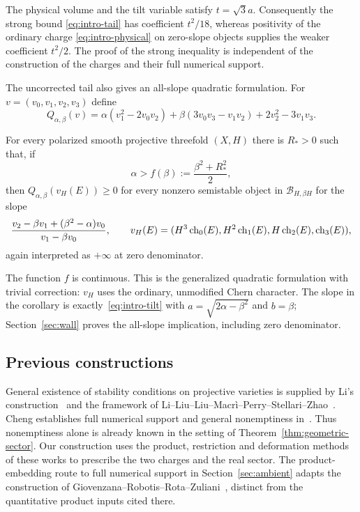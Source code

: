 The physical volume and the tilt variable satisfy $t=\sqrt3a$.
Consequently the strong bound \eqref{eq:intro-tail} has coefficient
$t^2/18$, whereas positivity of the ordinary charge
\eqref{eq:intro-physical} on zero-slope objects supplies the weaker
coefficient $t^2/2$. The proof of the strong inequality is independent of
the construction of the charges and their full numerical support.

The uncorrected tail also gives an all-slope quadratic formulation.
For $v=(v_0,v_1,v_2,v_3)$ define
\begin{equation}\label{eq:intro-quadratic}
 Q_{\alpha,\beta}(v)=
 \alpha(v_1^2-2v_0v_2)
 +\beta(3v_0v_3-v_1v_2)+2v_2^2-3v_1v_3.
\end{equation}
\begin{corollary}
\label{cor:quadratic-tail}
For every polarized smooth projective threefold $(X,H)$ there is $R_*>0$
such that, if
\[
 \alpha>f(\beta):=\frac{\beta^2+R_*^2}{2},
\]
then $Q_{\alpha,\beta}(v_H(E))\geq0$ for every nonzero semistable object
in $\mathcal B_{H,\beta H}$ for the slope
\[
 \frac{v_2-\beta v_1+(\beta^2-\alpha)v_0}{v_1-\beta v_0},
 \qquad
 v_H(E)=(H^3\operatorname{ch}_0(E),H^2\operatorname{ch}_1(E),H\operatorname{ch}_2(E),\operatorname{ch}_3(E)),
\]
again interpreted as $+\infty$ at zero denominator.
\end{corollary}
The function $f$ is continuous. This is the generalized quadratic
formulation with trivial correction: $v_H$ uses the ordinary,
unmodified Chern character. The slope in the corollary
is exactly~\eqref{eq:intro-tilt} with
$a=\sqrt{2\alpha-\beta^2}$ and $b=\beta$; Section~\ref{sec:wall}
proves the all-slope implication, including zero denominator.

\subsection{Previous constructions}

General existence of stability conditions on projective varieties is
supplied by Li's construction~\cite{Li2026} and the framework of
Li--Liu--Liu--Macr\`i--Perry--Stellari--Zhao~\cite{LiEtAl2026}.
Cheng establishes full numerical support and general nonemptiness
in~\cite{Cheng2026}. Thus nonemptiness alone is already known in the
setting of Theorem~\ref{thm:geometric-sector}. Our construction uses the
product, restriction and deformation methods of these works to prescribe
the two charges and the real sector.
The product-embedding route to full numerical support in
Section~\ref{sec:ambient} adapts the construction of
Giovenzana--Robotis--Rota--Zuliani~\cite{GiovenzanaRobotisRotaZuliani2026},
distinct from the quantitative product inputs cited there.

